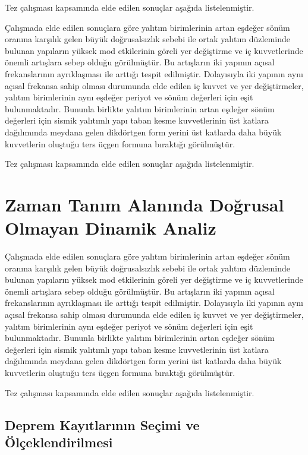 Tez çalışması kapsamında elde edilen sonuçlar aşağıda listelenmiştir. 

Çalışmada elde edilen sonuçlara göre yalıtım birimlerinin artan eşdeğer
sönüm oranına karşılık gelen büyük doğrusalsızlık sebebi ile ortak
yalıtım düzleminde bulunan yapıların yüksek mod etkilerinin göreli
yer değiştirme ve iç kuvvetlerinde önemli artışlara sebep olduğu görülmüştür.
Bu artışların iki yapının açısal frekanslarının ayrıklaşması ile arttığı
tespit edilmiştir. Dolayısıyla iki yapının aynı açısal frekansa sahip
olması durumunda elde edilen iç kuvvet ve yer değiştirmeler, yalıtım
birimlerinin aynı eşdeğer periyot ve sönüm değerleri için eşit bulunmaktadır.
Bununla birlikte yalıtım birimlerinin artan eşdeğer sönüm değerleri
için sismik yalıtımlı yapı taban kesme kuvvetlerinin üst katlara dağılımında
meydana gelen dikdörtgen form yerini üst katlarda daha büyük kuvvetlerin
oluştuğu ters üçgen formuna bıraktığı görülmüştür.

Tez çalışması kapsamında elde edilen sonuçlar aşağıda listelenmiştir. 

\section{Zaman Tanım Alanında Doğrusal Olmayan Dinamik Analiz}

Çalışmada elde edilen sonuçlara göre yalıtım birimlerinin artan eşdeğer
sönüm oranına karşılık gelen büyük doğrusalsızlık sebebi ile ortak
yalıtım düzleminde bulunan yapıların yüksek mod etkilerinin göreli
yer değiştirme ve iç kuvvetlerinde önemli artışlara sebep olduğu görülmüştür.
Bu artışların iki yapının açısal frekanslarının ayrıklaşması ile arttığı
tespit edilmiştir. Dolayısıyla iki yapının aynı açısal frekansa sahip
olması durumunda elde edilen iç kuvvet ve yer değiştirmeler, yalıtım
birimlerinin aynı eşdeğer periyot ve sönüm değerleri için eşit bulunmaktadır.
Bununla birlikte yalıtım birimlerinin artan eşdeğer sönüm değerleri
için sismik yalıtımlı yapı taban kesme kuvvetlerinin üst katlara dağılımında
meydana gelen dikdörtgen form yerini üst katlarda daha büyük kuvvetlerin
oluştuğu ters üçgen formuna bıraktığı görülmüştür.

Tez çalışması kapsamında elde edilen sonuçlar aşağıda listelenmiştir. 

\subsection{Deprem Kayıtlarının Seçimi ve Ölçeklendirilmesi}

